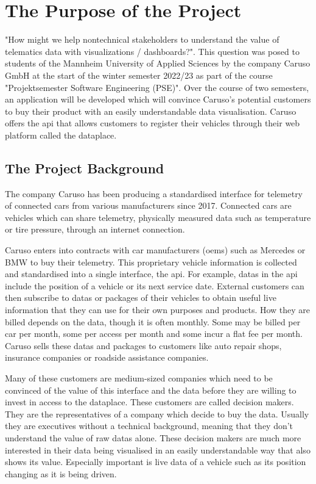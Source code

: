 \chapter{The Purpose of the Project}
"How might we help \gls{nontechnical} \glspl{stakeholder} to understand the value of telematics data with visualizations / dashboards?". This question was posed to students of the Mannheim University of Applied Sciences by the company Caruso GmbH at the start of the winter semester 2022/23 as part of the course "Projektsemester Software Engineering (PSE)". Over the course of two semesters, an application will be developed which will convince Caruso's potential customers to buy their product with an easily understandable data visualisation. Caruso offers the \gls{api} that allows customers to register their vehicles through their web platform called the \gls{dataplace}.

\section{The Project Background}
The company Caruso has been producing a standardised interface for \gls{telemetry} of connected cars from various manufacturers since 2017. Connected cars are vehicles which can share \gls{telemetry}, physically measured data such as temperature or tire pressure, through an internet connection.

Caruso enters into contracts with car manufacturers (\glspl{oem}) such as Mercedes or BMW to buy their \gls{telemetry}. This proprietary vehicle information is collected and standardised into a single interface, the \gls{api}. For example, \glspl{data} in the \gls{api} include the position of a vehicle or its next service date. External customers can then subscribe to \glspl{data} or packages of their vehicles to obtain useful live information that they can use for their own purposes and products. How they are billed depends on the \gls{data}, though it is often monthly. Some may be billed per car per month, some per access per month and some incur a flat fee per month. Caruso sells these \glspl{data} and packages to customers like auto repair shops, insurance companies or roadside assistance companies. 

Many of these customers are medium-sized companies which need to be convinced of the value of this interface and the data before they are willing to invest in access to the \gls{dataplace}. These customers are called decision makers. They are the representatives of a company which decide to buy the data. Usually they are executives without a technical background, meaning that they don't understand the value of raw \glspl{data} alone. These decision makers are much more interested in their data being visualised in an easily understandable way that also shows its value. Especially important is live data of a vehicle such as its position changing as it is being driven.

